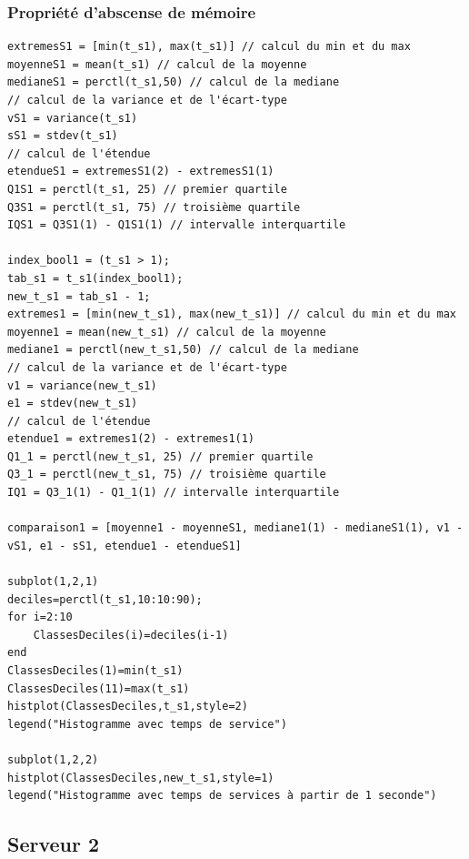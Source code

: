 \documentclass{article}
\begin{document}
\subsubsection{Propriété d'abscense de mémoire}
\begin{verbatim}
extremesS1 = [min(t_s1), max(t_s1)] // calcul du min et du max
moyenneS1 = mean(t_s1) // calcul de la moyenne
medianeS1 = perctl(t_s1,50) // calcul de la mediane
// calcul de la variance et de l'écart-type
vS1 = variance(t_s1)
sS1 = stdev(t_s1)
// calcul de l'étendue
etendueS1 = extremesS1(2) - extremesS1(1)
Q1S1 = perctl(t_s1, 25) // premier quartile
Q3S1 = perctl(t_s1, 75) // troisième quartile
IQS1 = Q3S1(1) - Q1S1(1) // intervalle interquartile

index_bool1 = (t_s1 > 1);
tab_s1 = t_s1(index_bool1);
new_t_s1 = tab_s1 - 1;
extremes1 = [min(new_t_s1), max(new_t_s1)] // calcul du min et du max
moyenne1 = mean(new_t_s1) // calcul de la moyenne
mediane1 = perctl(new_t_s1,50) // calcul de la mediane
// calcul de la variance et de l'écart-type
v1 = variance(new_t_s1)
e1 = stdev(new_t_s1)
// calcul de l'étendue
etendue1 = extremes1(2) - extremes1(1)
Q1_1 = perctl(new_t_s1, 25) // premier quartile
Q3_1 = perctl(new_t_s1, 75) // troisième quartile
IQ1 = Q3_1(1) - Q1_1(1) // intervalle interquartile

comparaison1 = [moyenne1 - moyenneS1, mediane1(1) - medianeS1(1), v1 - vS1, e1 - sS1, etendue1 - etendueS1]

subplot(1,2,1)
deciles=perctl(t_s1,10:10:90);
for i=2:10
    ClassesDeciles(i)=deciles(i-1)
end
ClassesDeciles(1)=min(t_s1)
ClassesDeciles(11)=max(t_s1)
histplot(ClassesDeciles,t_s1,style=2)
legend("Histogramme avec temps de service")

subplot(1,2,2)
histplot(ClassesDeciles,new_t_s1,style=1)
legend("Histogramme avec temps de services à partir de 1 seconde")
\end{verbatim}

\subsection{Serveur 2}
\end{document}
